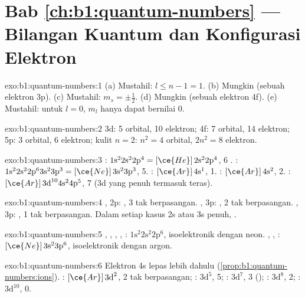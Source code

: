 \section*{Bab \ref{ch:b1:quantum-numbers} --- Bilangan Kuantum dan Konfigurasi Elektron}

\begin{solution}{exo:b1:quantum-numbers:1}
(a) Mustahil: $l \le n - 1 = 1$. (b) Mungkin (sebuah elektron 3p).
(c) Mustahil: $m_s = \pm\tfrac12$. (d) Mungkin (sebuah elektron 4f).
(e) Mustahil: untuk $l = 0$, $m_l$ hanya dapat bernilai 0.
\end{solution}

\begin{solution}{exo:b1:quantum-numbers:2}
3d: 5 orbital, 10 elektron; 4f: 7 orbital, 14 elektron; 5p: 3 orbital,
6 elektron; kulit $n = 2$: $n^2 = 4$ orbital, $2n^2 = 8$ elektron.
\end{solution}

\begin{solution}{exo:b1:quantum-numbers:3}
: $1\text{s}^2 2\text{s}^2 2\text{p}^4 = [\ce{He}]\,2\text{s}^2 2\text{p}^4$,
6 . : $1\text{s}^2 2\text{s}^2 2\text{p}^6 3\text{s}^2
3\text{p}^3 = [\ce{Ne}]\,3\text{s}^2 3\text{p}^3$, 5. : $[\ce{Ar}]\,4\text{s}^1$,
1. : $[\ce{Ar}]\,4\text{s}^2$, 2. : $[\ce{Ar}]\,3\text{d}^{10}
4\text{s}^2 4\text{p}^5$, 7 (3d yang penuh termasuk teras).
\end{solution}

\begin{solution}{exo:b1:quantum-numbers:4}
, 2p: , 3 tak berpasangan. , 3p: ,
2 tak berpasangan. , 3p: , 1 tak berpasangan. Dalam
setiap kasus 2s atau 3s penuh, .
\end{solution}

\begin{solution}{exo:b1:quantum-numbers:5}
, , , , : $1\text{s}^2
2\text{s}^2 2\text{p}^6$, isoelektronik dengan neon. , ,
: $[\ce{Ne}]\,3\text{s}^2 3\text{p}^6$, isoelektronik dengan
argon.
\end{solution}

\begin{solution}{exo:b1:quantum-numbers:6}
Elektron 4s lepas lebih dahulu (\cref{prop:b1:quantum-numbers:ions}).
: $[\ce{Ar}]\,3\text{d}^2$, 2 tak berpasangan; :
$3\text{d}^5$, 5; : $3\text{d}^7$, 3 ();
: $3\text{d}^8$, 2; : $3\text{d}^{10}$, 0.
\end{solution}

